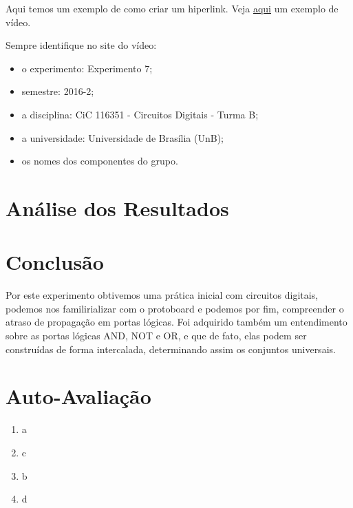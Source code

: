 \documentclass[12pt]{article}
\begin{document}
Aqui temos um exemplo de como criar um hiperlink. Veja
\href{https://www.youtube.com/watch?v=EcNxjxKRQ6E}{aqui} um exemplo de vídeo.

Sempre identifique no site do vídeo:
\begin{itemize}
    \item o experimento: Experimento 7;
    \item semestre: 2016-2;
    \item a disciplina: CiC 116351 - Circuitos Digitais - Turma B;
    \item a universidade: Universidade de Brasília (UnB);
    \item os nomes dos componentes do grupo.
\end{itemize}

\section{Análise dos Resultados}
\label{sec:Resultados}


\section{Conclusão}
\label{sec:Conclusao}

Por este experimento obtivemos uma prática inicial com circuitos digitais, podemos nos familirializar com o protoboard e podemos por fim, compreender o atraso de propagação em portas  lógicas. 
Foi adquirido também um entendimento sobre as portas lógicas AND, NOT e OR, e que de fato, elas podem ser construídas de forma intercalada, determinando assim os conjuntos universais.






\newpage 
\section*{Auto-Avaliação}

\begin{enumerate}
    \item a
    \item c
    \item b
    \item d
\end{enumerate}
\end{document}
